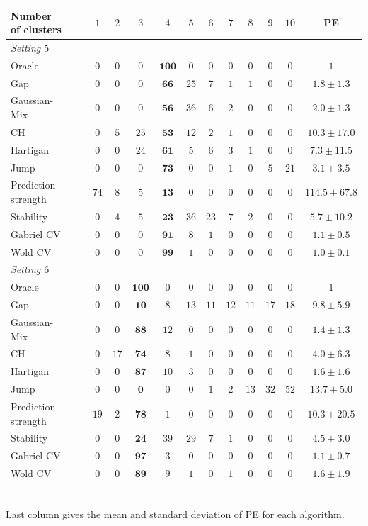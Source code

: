 \documentclass[11pt]{article}
\begin{document}
\begin{table}[H]
\centering
\begin{tabular}{ lccccccccccccc}
\hline
 Number of clusters &&& $1$&$2$&$3$&$4$&$5$&$6$&$7$&$8$&$9$&$10$&PE \\ \hline
\textit{Setting $5$} &&& &&&&&&&&& \\
Oracle&&& $0$&$0$&$0$&$\mathbf{100}$&$0$&$0$&$0$&$0$&$0$&$0$&$1$\\ 
Gap&&& $0$&$0$&$0$&$\mathbf{66}$&$25$&$7$&$1$&$1$&$0$&$0$&$1.8\pm 1.3$\\ 
Gaussian-Mix&&& $0$&$0$&$0$&$\mathbf{56}$&$36$&$6$&$2$&$0$&$0$&$0$&$2.0\pm 1.3$\\ 
CH&&& $0$&$5$&$25$&$\mathbf{53}$&$12$&$2$&$1$&$0$&$0$&$0$&$10.3\pm 17.0$\\ 
Hartigan&&& $0$&$0$&$24$&$\mathbf{61}$&$5$&$6$&$3$&$1$&$0$&$0$&$7.3\pm 11.5$\\
Jump&&& $0$&$0$&$0$&$\mathbf{73}$&$0$&$0$&$1$&$0$&$5$&$21$&$3.1\pm 3.5$\\ 
Prediction strength&&&$74$&$8$&$5$&$\mathbf{13}$&$0$&$0$&$0$&$0$&$0$&$0$&$114.5\pm 67.8$\\ 
Stability&&& $0$&$4$&$5$&$\mathbf{23}$&$36$&$23$&$7$&$2$&$0$&$0$&$5.7\pm 10.2$\\
Gabriel CV&&& $0$&$0$&$0$&$\mathbf{91}$&$8$&$1$&$0$&$0$&$0$&$0$&$1.1\pm 0.5$\\ 
Wold CV&&& $0$&$0$&$0$&$\mathbf{99}$&$1$&$0$&$0$&$0$&$0$&$0$&$1.0\pm 0.1$\\ 
\hline
\textit{Setting $6$} &&& &&&&&&&&& \\
Oracle&&& $0$&$0$&$\mathbf{100}$&$0$&$0$&$0$&$0$&$0$&$0$&$0$&$1$\\ 
Gap&&& $0$&$0$&$\mathbf{10}$&$8$&$13$&$11$&$12$&$11$&$17$&$18$&$9.8\pm 5.9$\\ 
Gaussian-Mix&&& $0$&$0$&$\mathbf{88}$&$12$&$0$&$0$&$0$&$0$&$0$&$0$&$1.4\pm 1.3$\\ 
CH&&& $0$&$17$&$\mathbf{74}$&$8$&$1$&$0$&$0$&$0$&$0$&$0$&$4.0\pm 6.3$\\ 
Hartigan&&& $0$&$0$&$\mathbf{87}$&$10$&$3$&$0$&$0$&$0$&$0$&$0$&$1.6\pm 1.6$\\
Jump&&& $0$&$0$&$\mathbf{0}$&$0$&$0$&$1$&$2$&$13$&$32$&$52$&$13.7\pm 5.0$\\ 
Prediction strength&&&$19$&$2$&$\mathbf{78}$&$1$&$0$&$0$&$0$&$0$&$0$&$0$&$10.3\pm 20.5$\\ 
Stability&&& $0$&$0$&$\mathbf{24}$&$39$&$29$&$7$&$1$&$0$&$0$&$0$&$4.5\pm 3.0$\\
Gabriel CV&&& $0$&$0$&$\mathbf{97}$&$3$&$0$&$0$&$0$&$0$&$0$&$0$&$1.1\pm 0.7$\\ 
Wold CV&&& $0$&$0$&$\mathbf{89}$&$9$&$1$&$0$&$1$&$0$&$0$&$0$&$1.6\pm 1.9$\\ 
\hline
\end{tabular}\\
\hspace{-1.8in} \footnotesize {Last column gives the mean and standard deviation of PE for each algorithm}.
\end{table}
\end{document}
